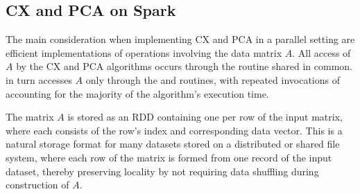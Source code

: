 \subsection{CX and PCA on Spark}
\label{sec:cx_spark}
The main consideration when implementing CX and PCA in a parallel setting are
efficient implementations of operations involving the data matrix $A$.
All access of $A$ by the CX and PCA algorithms occurs through the
 routine shared in common.
 in turn accesses $A$ only through the  and
 routines, with repeated invocations of 
accounting for the majority of the algorithm's execution time.

The matrix $A$ is stored as an RDD containing one  per row of the input matrix,
where each  consists of the row's index and corresponding data vector.
This is a natural storage format for many datasets stored on a distributed or shared file
system, where each row of the matrix is formed from one record of the
input dataset, thereby preserving locality by not requiring data shuffling
during construction of $A$.

